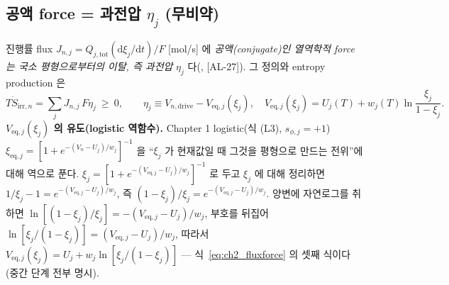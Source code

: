\documentclass[11pt,a4paper]{article}
\newcommand{\dd}{\mathrm{d}}
\newcommand{\eq}{\mathrm{eq}}
\newcommand{\drive}{\mathrm{drive}}
\newcommand{\tot}{\mathrm{tot}}
\newcommand{\irr}{\mathrm{irr}}
\newcommand{\AL}[1]{\textsf{[AL-#1]}}
\begin{document}
\subsection{공액 force = 과전압 $\eta_j$ (무비약)}\label{sec:ch2_fluxforce}
진행률 flux $J_{n,j}=Q_{j,\tot}(\dd\xi_j/\dd t)/F$ [mol/s] 에 \emph{공액(conjugate)인 열역학적 force 는
국소 평형으로부터의 이탈, 즉 과전압} $\eta_j$ 다(\cite{newman,bardfaulkner}, \AL{27}). 그 정의와 entropy
production 은
\begin{equation}
T\dot S_{\irr,n}=\sum_j J_{n,j}\,F\eta_j\ \ge\ 0,\qquad
\eta_j\equiv V_{n,\drive}-V_{\eq,j}(\xi_j),\quad
V_{\eq,j}(\xi_j)=U_j(T)+w_j(T)\ln\frac{\xi_j}{1-\xi_j}.
\label{eq:ch2_fluxforce}
\end{equation}
\textbf{$V_{\eq,j}(\xi_j)$ 의 유도(logistic 역함수).} Chapter 1 logistic(식 (L3), $s_{\phi,j}=+1$)
$\xi_{\eq,j}=[1+e^{-(V_n-U_j)/w_j}]^{-1}$ 을 ``$\xi_j$ 가 현재값일 때 그것을 평형으로 만드는 전위''에 대해
역으로 푼다. $\xi_j=[1+e^{-(V_{\eq,j}-U_j)/w_j}]^{-1}$ 로 두고 $\xi_j$ 에 대해 정리하면 $1/\xi_j-1=e^{-(V_{\eq,j}-U_j)/w_j}$,
즉 $(1-\xi_j)/\xi_j=e^{-(V_{\eq,j}-U_j)/w_j}$. 양변에 자연로그를 취하면 $\ln[(1-\xi_j)/\xi_j]=-(V_{\eq,j}-U_j)/w_j$,
부호를 뒤집어 $\ln[\xi_j/(1-\xi_j)]=(V_{\eq,j}-U_j)/w_j$, 따라서 $V_{\eq,j}(\xi_j)=U_j+w_j\ln[\xi_j/(1-\xi_j)]$
— 식~\eqref{eq:ch2_fluxforce} 의 셋째 식이다(중간 단계 전부 명시).
\end{document}
